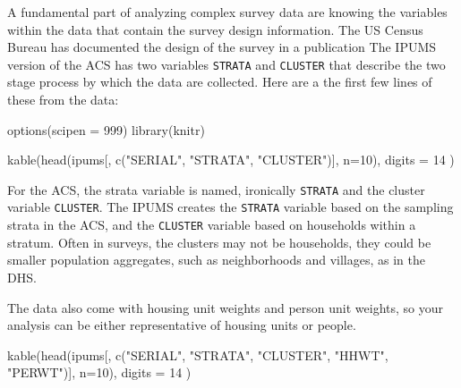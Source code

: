 \documentclass[
]{article}
\newenvironment{Shaded}{\begin{snugshade}}{\end{snugshade}}
\newcommand{\AttributeTok}[1]{\textcolor[rgb]{0.77,0.63,0.00}{#1}}
\newcommand{\DecValTok}[1]{\textcolor[rgb]{0.00,0.00,0.81}{#1}}
\newcommand{\FunctionTok}[1]{\textcolor[rgb]{0.00,0.00,0.00}{#1}}
\newcommand{\NormalTok}[1]{#1}
\newcommand{\StringTok}[1]{\textcolor[rgb]{0.31,0.60,0.02}{#1}}
\begin{document}
A fundamental part of analyzing complex survey data are knowing the variables within the data that contain the survey design information. The US Census Bureau has documented the design of the survey in a publication \citep{uscensusbureau2014} The IPUMS version of the ACS has two variables \texttt{STRATA} and \texttt{CLUSTER} that describe the two stage process by which the data are collected. Here are a the first few lines of these from the data:

\begin{Shaded}
\begin{Highlighting}[]
\FunctionTok{options}\NormalTok{(}\AttributeTok{scipen =} \DecValTok{999}\NormalTok{)}
\FunctionTok{library}\NormalTok{(knitr)}
  
\FunctionTok{kable}\NormalTok{(}\FunctionTok{head}\NormalTok{(ipums[, }\FunctionTok{c}\NormalTok{(}\StringTok{"SERIAL"}\NormalTok{, }\StringTok{"STRATA"}\NormalTok{, }\StringTok{"CLUSTER"}\NormalTok{)],}
           \AttributeTok{n=}\DecValTok{10}\NormalTok{),}
      \AttributeTok{digits =} \DecValTok{14}\NormalTok{ )}
\end{Highlighting}
\end{Shaded}

For the ACS, the strata variable is named, ironically \texttt{STRATA} and the cluster variable \texttt{CLUSTER}. The IPUMS creates the \texttt{STRATA} variable based on the sampling strata in the ACS, and the \texttt{CLUSTER} variable based on households within a stratum. Often in surveys, the clusters may not be households, they could be smaller population aggregates, such as neighborhoods and villages, as in the DHS.

The data also come with housing unit weights and person unit weights, so your analysis can be either representative of housing units or people.

\begin{Shaded}
\begin{Highlighting}[]
\FunctionTok{kable}\NormalTok{(}\FunctionTok{head}\NormalTok{(ipums[, }\FunctionTok{c}\NormalTok{(}\StringTok{"SERIAL"}\NormalTok{, }\StringTok{"STRATA"}\NormalTok{, }\StringTok{"CLUSTER"}\NormalTok{, }\StringTok{"HHWT"}\NormalTok{, }\StringTok{"PERWT"}\NormalTok{)],}
           \AttributeTok{n=}\DecValTok{10}\NormalTok{),}
      \AttributeTok{digits =} \DecValTok{14}\NormalTok{ )}
\end{Highlighting}
\end{Shaded}
\end{document}
